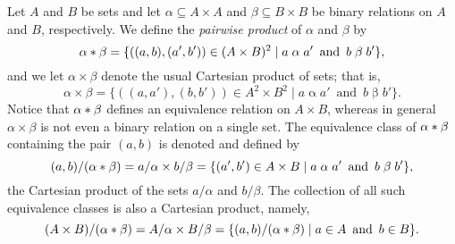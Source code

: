 Let $A$ and $B$ be sets and let $\alpha \subseteq A\times A$ and $\beta \subseteq B\times B$
be binary relations on $A$ and $B$, respectively.
We define
the \emph{pairwise product} of $\alpha$ and $\beta$ by
\begin{equation}
\label{eq:pair-product}
\alpha \mytimes \beta = \{((a, b), (a', b')) 
\in (A\times B)^2 \mid a\mathrel{\alpha} a'\, \text{ and } \,  b\mathrel{\beta} b'\},
\end{equation}
and we let $\alpha \times \beta$ denote the usual Cartesian product of sets; that is,
\begin{equation}
\label{eq:set-product}
\alpha \times \beta = \{((a, a'), (b, b')) 
\in A^2\times B^2 \mid a\mathrel{\alpha} a' \, \text{ and } \, b\mathrel{\beta} b'\}.
\end{equation}
Notice that $\alpha \ast \beta$ defines an equivalence relation on
$A\times B$, whereas in general $\alpha\times \beta$ is 
not even a binary relation on a single set.
The equivalence class of $\alpha \ast \beta$ containing the pair
$(a, b)$ is denoted and defined by %
\[(a,b)/(\alpha \ast \beta) = a/\alpha \times b/\beta= 
    \{(a', b') \in A\times B \mid a\mathrel{\alpha} a' \, \text{ and } \,  b\mathrel{\beta} b'\},
    \]
the Cartesian product of the sets $a/\alpha$ and $b/\beta$.
The collection of all such equivalence classes is also a Cartesian product, namely,
\[
(A\times B)/(\alpha \ast \beta) =
A/\alpha \times B/\beta  = \{(a, b)/(\alpha \ast \beta) \mid a\in A \, \text{ and } \, b \in B\}.\]

